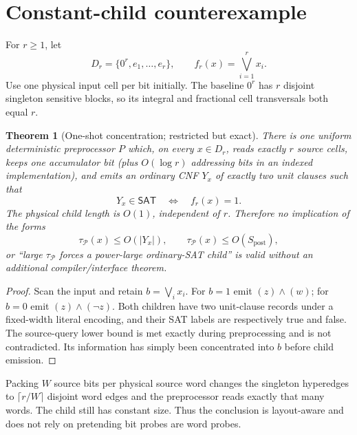 \documentclass[11pt]{article}
\newtheorem{theorem}{Theorem}
\newcommand{\SAT}{\mathsf{SAT}}
\begin{document}
\section{Constant-child counterexample}
For $r\ge1$, let
\[
D_r=\{0^r,e_1,\ldots,e_r\},\qquad f_r(x)=\bigvee_{i=1}^r x_i.
\]
Use one physical input cell per bit initially.  The baseline $0^r$ has $r$ disjoint singleton sensitive blocks, so its integral and fractional cell transversals both equal $r$.

\begin{theorem}[One-shot concentration; restricted but exact]\label{th:or}
There is one uniform deterministic preprocessor $P$ which, on every $x\in D_r$, reads exactly $r$ source cells, keeps one accumulator bit (plus $O(\log r)$ addressing bits in an indexed implementation), and emits an ordinary CNF $Y_x$ of exactly two unit clauses such that
\[
Y_x\in\SAT\quad\Longleftrightarrow\quad f_r(x)=1.
\]
The physical child length is $O(1)$, independent of $r$.  Therefore no implication of the forms
\[
\tau_{\mathcal P}(x)\le O(|Y_x|),\qquad
\tau_{\mathcal P}(x)\le O(S_{\mathrm{post}}),
\]
or ``large $\tau_{\mathcal P}$ forces a power-large ordinary-SAT child'' is valid without an additional compiler/interface theorem.
\end{theorem}
\begin{proof}
Scan the input and retain $b=\bigvee_i x_i$.  For $b=1$ emit $(z)\wedge(w)$; for $b=0$ emit $(z)\wedge(\neg z)$.  Both children have two unit-clause records under a fixed-width literal encoding, and their SAT labels are respectively true and false.  The source-query lower bound is met exactly during preprocessing and is not contradicted.  Its information has simply been concentrated into $b$ before child emission.
\end{proof}

Packing $W$ source bits per physical source word changes the singleton hyperedges to $\lceil r/W\rceil$ disjoint word edges and the preprocessor reads exactly that many words.  The child still has constant size.  Thus the conclusion is layout-aware and does not rely on pretending bit probes are word probes.
\end{document}

